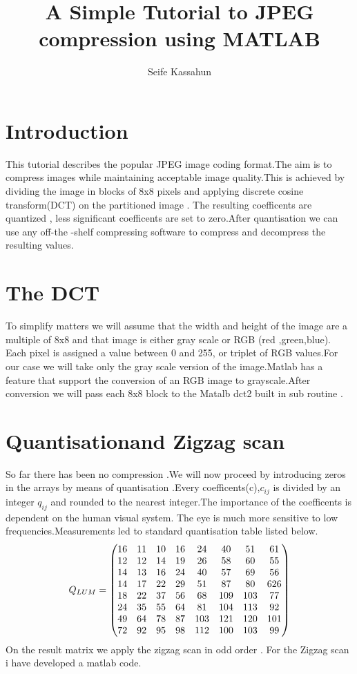 \documentclass[12pt]{article}
\title{A Simple Tutorial to JPEG compression using MATLAB}
\author{Seife Kassahun}
\begin{document}
\maketitle
\section {Introduction}
This tutorial describes the popular JPEG image coding format.The aim is to compress images while maintaining acceptable  image quality.This is achieved by dividing the image in blocks of 8x8 pixels and applying discrete cosine transform(DCT) on the partitioned image . The resulting coefficents are quantized , less significant coefficents are set to zero.After quantisation we can use any off-the -shelf compressing software to compress and decompress the resulting values.
\section {The DCT}
To simplify matters we will assume that the width and height of the image are a multiple of 8x8 and that image is either gray scale or RGB (red ,green,blue). Each pixel is assigned a value between 0 and 255, or triplet of RGB values.For our case we will take only the gray scale version of the image.Matlab has a feature that support the conversion of  an RGB image to grayscale.After conversion we will pass each 8x8 block to the Matalb dct2 built in sub routine . 
\section {Quantisationand Zigzag scan}
So far there has been no compression .We will now proceed by introducing zeros in the arrays  by means of quantisation .Every coefficents(c),$ c _{ij}$ is divided by an integer $ q_{ij}$ and rounded to the nearest integer.The importance of the coefficents is dependent on the human visual system. The eye is much more  sensitive to low frequencies.Measurements led to standard quantisation table listed below.
\[
Q_{LUM}=
\begin{pmatrix}
16 & 11 & 10 & 16 & 24 & 40 & 51 & 61\cr
12  & 12 &14 & 19 & 26 & 58 & 60 & 55\cr
14 & 13 & 16 & 24 & 40 & 57 & 69 & 56\cr
14 & 17 & 22 & 29 & 51 & 87 & 80 & 626 \cr
18 & 22 & 37 & 56 & 68 & 109 & 103 & 77\cr
24 & 35 & 55 & 64 & 81 & 104 & 113 & 92\cr
49 & 64 & 78 & 87 & 103 & 121 & 120 & 101\cr
72 & 92 & 95 & 98 & 112 & 100 & 103 & 99\cr
\end{pmatrix}
\]
On the result matrix we apply the zigzag scan  in odd order . For the Zigzag scan i have developed a matlab code.
\end{document}
